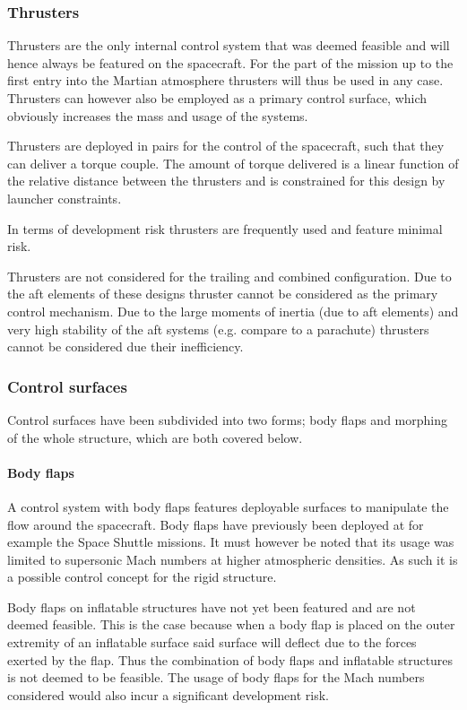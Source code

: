 \subsubsection{Thrusters}
Thrusters are the only internal control system that was deemed feasible and will hence always be featured on the spacecraft. For the part of the mission up to the first entry into the Martian atmosphere thrusters will thus be used in any case. Thrusters can however also be employed as a primary control surface, which obviously increases the mass and usage of the systems.

Thrusters are deployed in pairs for the control of the spacecraft, such that they can deliver a torque couple. The amount of torque delivered is a linear function of the relative distance between the thrusters and is constrained for this design by launcher constraints. 

In terms of development risk thrusters are frequently used and feature minimal risk.

Thrusters are not considered for the trailing and combined configuration. Due to the aft elements of these designs thruster cannot be considered as the primary control mechanism. Due to the large moments of inertia (due to aft elements) and very high stability of the aft systems (e.g. compare to a parachute) thrusters cannot be considered due their inefficiency. 

\subsubsection{Control surfaces}
Control surfaces have been subdivided into two forms; body flaps and morphing of the whole structure, which are both covered below.

\paragraph{Body flaps}
A control system with body flaps features deployable surfaces to manipulate the flow around the spacecraft. Body flaps have previously been deployed at for example the Space Shuttle missions. It must however be noted that its usage was limited to supersonic Mach numbers at higher atmospheric densities. As such it is a possible control concept for the rigid structure.

Body flaps on inflatable structures have not yet been featured and are not deemed feasible. This is the case because when a body flap is placed on the outer extremity of an inflatable surface said surface will deflect due to the forces exerted by the flap. Thus the combination of body flaps and inflatable structures is not deemed to be feasible. The usage of body flaps for the Mach numbers considered would also incur a significant development risk.

